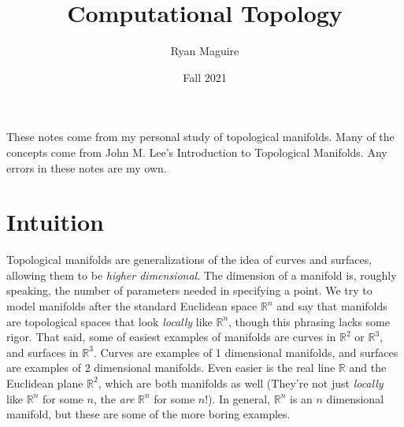 \documentclass{article}
\title{Computational Topology}
\author{Ryan Maguire}
\date{Fall 2021}
\theoremstyle{plain}
\theoremstyle{normal}
\begin{document}
    \maketitle
    These notes come from my personal study of topological manifolds. Many of
    the concepts come from John M. Lee's Introduction to Topological
    Manifolds. Any errors in these notes are my own.
    \tableofcontents
    \section{Intuition}
        Topological manifolds are generalizations of the idea of curves and
        surfaces, allowing them to be \textit{higher dimensional}. The
        dimension of a manifold is, roughly speaking, the number of parameters
        needed in specifying a point. We try to model manifolds after the
        standard Euclidean space $\mathbb{R}^{n}$ and say that manifolds are
        topological spaces that look \textit{locally} like $\mathbb{R}^{n}$,
        though this phrasing lacks some rigor. That said, some of easiest
        examples of manifolds are curves in $\mathbb{R}^{2}$ or
        $\mathbb{R}^{3}$, and surfaces in $\mathbb{R}^{3}$. Curves are examples
        of 1 dimensional manifolds, and surfaces are examples of 2 dimensional
        manifolds. Even easier is the real line $\mathbb{R}$ and the
        Euclidean plane $\mathbb{R}^{2}$, which are both manifolds as well
        (They're not just \textit{locally} like $\mathbb{R}^{n}$ for some
        $n$, the \textit{are} $\mathbb{R}^{n}$ for some $n$!). In general,
        $\mathbb{R}^{n}$ is an $n$ dimensional manifold, but these are some of
        the more boring examples.
\end{document}
